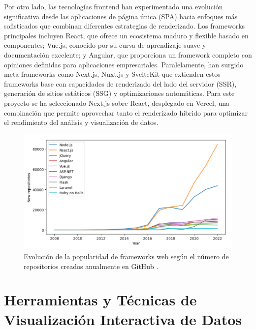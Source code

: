 Por otro lado, las tecnologías frontend han experimentado una evolución significativa desde las aplicaciones de página única (SPA) hacia enfoques más sofisticados que combinan diferentes estrategias de renderizado. Los frameworks principales \cite{Swacha2023_WebFrameworks} incluyen React, que ofrece un ecosistema maduro y flexible basado en componentes; Vue.js, conocido por su curva de aprendizaje suave y documentación excelente; y Angular, que proporciona un framework completo con opiniones definidas para aplicaciones empresariales. Paralelamente, han surgido meta-frameworks como Next.js, Nuxt.js y SvelteKit que extienden estos frameworks base con capacidades de renderizado del lado del servidor (SSR), generación de sitios estáticos (SSG) y optimizaciones automáticas. Para este proyecto se ha seleccionado Next.js sobre React, desplegado en Vercel, una combinación que permite aprovechar tanto el renderizado híbrido para optimizar el rendimiento del análisis y visualización de datos.

\begin{figure}[htbp]
\centering
\includegraphics[width=\textwidth]{imagenes/grafica_frameworks.png}
\caption{Evolución de la popularidad de frameworks web según el número de repositorios creados anualmente en GitHub \cite{Swacha2023_WebFrameworks}.}
\label{fig:frameworks_github}
\end{figure}



\section{Herramientas y Técnicas de Visualización Interactiva de Datos}

